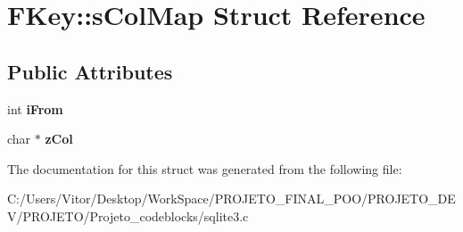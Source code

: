 \hypertarget{struct_f_key_1_1s_col_map}{\section{F\-Key\-:\-:s\-Col\-Map Struct Reference}
\label{struct_f_key_1_1s_col_map}
}
\subsection*{Public Attributes}
\begin{DoxyCompactItemize}
\item 
\hypertarget{struct_f_key_1_1s_col_map_a2b0ed19d4924a93d1f3f14f891b176ed}{int {\bfseries i\-From}}\label{struct_f_key_1_1s_col_map_a2b0ed19d4924a93d1f3f14f891b176ed}

\item 
\hypertarget{struct_f_key_1_1s_col_map_a4cdef475be73cc460873051a2c2c2937}{char $\ast$ {\bfseries z\-Col}}\label{struct_f_key_1_1s_col_map_a4cdef475be73cc460873051a2c2c2937}

\end{DoxyCompactItemize}


The documentation for this struct was generated from the following file\-:\begin{DoxyCompactItemize}
\item 
C\-:/\-Users/\-Vitor/\-Desktop/\-Work\-Space/\-P\-R\-O\-J\-E\-T\-O\-\_\-\-F\-I\-N\-A\-L\-\_\-\-P\-O\-O/\-P\-R\-O\-J\-E\-T\-O\-\_\-\-D\-E\-V/\-P\-R\-O\-J\-E\-T\-O/\-Projeto\-\_\-codeblocks/sqlite3.\-c\end{DoxyCompactItemize}

